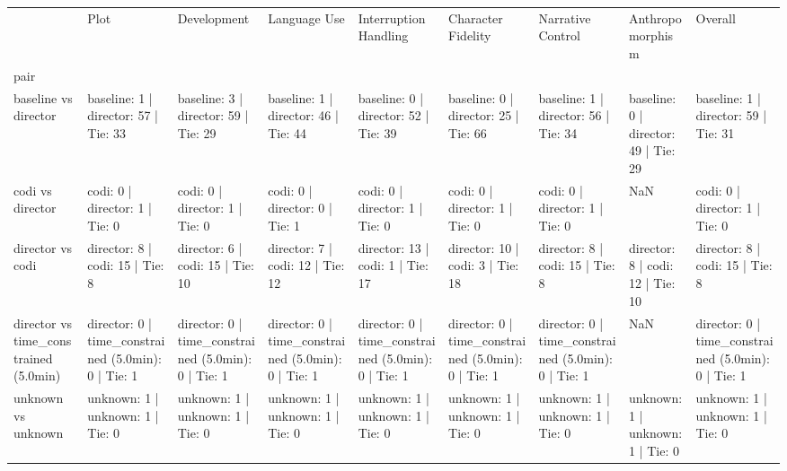 \begin{tabular}{lllllllll}
\toprule
 & Plot & Development & Language Use & Interruption Handling & Character Fidelity & Narrative Control & Anthropomorphism & Overall \\
pair &  &  &  &  &  &  &  &  \\
\midrule
baseline vs director & baseline: 1 | director: 57 | Tie: 33 & baseline: 3 | director: 59 | Tie: 29 & baseline: 1 | director: 46 | Tie: 44 & baseline: 0 | director: 52 | Tie: 39 & baseline: 0 | director: 25 | Tie: 66 & baseline: 1 | director: 56 | Tie: 34 & baseline: 0 | director: 49 | Tie: 29 & baseline: 1 | director: 59 | Tie: 31 \\
codi vs director & codi: 0 | director: 1 | Tie: 0 & codi: 0 | director: 1 | Tie: 0 & codi: 0 | director: 0 | Tie: 1 & codi: 0 | director: 1 | Tie: 0 & codi: 0 | director: 1 | Tie: 0 & codi: 0 | director: 1 | Tie: 0 & NaN & codi: 0 | director: 1 | Tie: 0 \\
director vs codi & director: 8 | codi: 15 | Tie: 8 & director: 6 | codi: 15 | Tie: 10 & director: 7 | codi: 12 | Tie: 12 & director: 13 | codi: 1 | Tie: 17 & director: 10 | codi: 3 | Tie: 18 & director: 8 | codi: 15 | Tie: 8 & director: 8 | codi: 12 | Tie: 10 & director: 8 | codi: 15 | Tie: 8 \\
director vs time_constrained (5.0min) & director: 0 | time_constrained (5.0min): 0 | Tie: 1 & director: 0 | time_constrained (5.0min): 0 | Tie: 1 & director: 0 | time_constrained (5.0min): 0 | Tie: 1 & director: 0 | time_constrained (5.0min): 0 | Tie: 1 & director: 0 | time_constrained (5.0min): 0 | Tie: 1 & director: 0 | time_constrained (5.0min): 0 | Tie: 1 & NaN & director: 0 | time_constrained (5.0min): 0 | Tie: 1 \\
unknown vs unknown & unknown: 1 | unknown: 1 | Tie: 0 & unknown: 1 | unknown: 1 | Tie: 0 & unknown: 1 | unknown: 1 | Tie: 0 & unknown: 1 | unknown: 1 | Tie: 0 & unknown: 1 | unknown: 1 | Tie: 0 & unknown: 1 | unknown: 1 | Tie: 0 & unknown: 1 | unknown: 1 | Tie: 0 & unknown: 1 | unknown: 1 | Tie: 0 \\
\bottomrule
\end{tabular}
